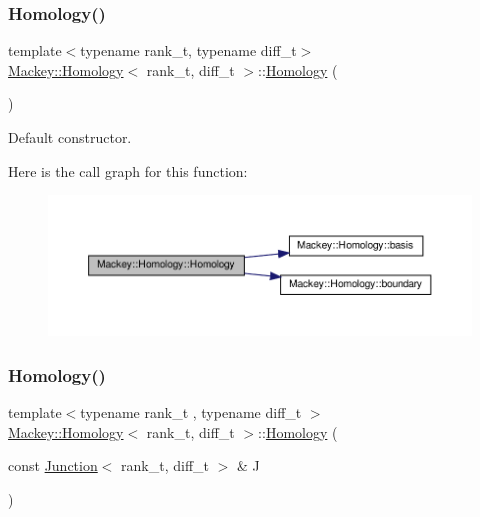 \subsubsection{\texorpdfstring{Homology()}{Homology()}\hspace{0.1cm}{\footnotesize\ttfamily [1/3]}}
{\footnotesize\ttfamily template$<$typename rank\+\_\+t, typename diff\+\_\+t$>$ \\
\hyperlink{classMackey_1_1Homology}{Mackey\+::\+Homology}$<$ rank\+\_\+t, diff\+\_\+t $>$\+::\hyperlink{classMackey_1_1Homology}{Homology} (\begin{DoxyParamCaption}{ }\end{DoxyParamCaption})\hspace{0.3cm}{\ttfamily [inline]}}



Default constructor. 

Here is the call graph for this function\+:\nopagebreak
\begin{figure}[H]
\begin{center}
\leavevmode
\includegraphics[width=350pt]{classMackey_1_1Homology_a3580b194f986bd59a02fb84db97e00f2_cgraph}
\end{center}
\end{figure}
\mbox{\label{classMackey_1_1Homology_a31e26f0fb8e1cd7f0506ae1dbc97ea22}} 
\subsubsection{\texorpdfstring{Homology()}{Homology()}\hspace{0.1cm}{\footnotesize\ttfamily [2/3]}}
{\footnotesize\ttfamily template$<$typename rank\+\_\+t , typename diff\+\_\+t $>$ \\
\hyperlink{classMackey_1_1Homology}{Mackey\+::\+Homology}$<$ rank\+\_\+t, diff\+\_\+t $>$\+::\hyperlink{classMackey_1_1Homology}{Homology} (\begin{DoxyParamCaption}\item[{const \hyperlink{classMackey_1_1Junction}{Junction}$<$ rank\+\_\+t, diff\+\_\+t $>$ \&}]{J }\end{DoxyParamCaption})}



